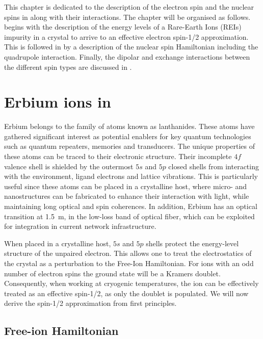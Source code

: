 This chapter is dedicated to the description of the \Er electron spin and the nuclear spins in \Ca along with their interactions. The chapter will be organised as follows.  begins with the description of the energy levels of a Rare-Earth Ions (REIs) impurity in a crystal to arrive to an effective electron spin-1/2 approximation. This is followed in  by a description of the nuclear spin Hamiltonian including the quadrupole interaction. Finally, the dipolar and exchange interactions between the different spin types are discussed in .

\section{Erbium ions in \Ca}

Erbium belongs to the family of atoms known as lanthanides. These atoms have gathered significant interest as potential enablers for key quantum technologies such as quantum repeaters, memories and transducers. The unique properties of these atoms can be traced to their electronic structure. Their incomplete $4f$ valence shell is shielded by the outermost $5s$ and $5p$ closed shells from interacting with the environment, ligand electrons and lattice vibrations. This is particularly useful since these atoms can be placed in a crystalline host, where micro- and nanostructures can be fabricated to enhance their interaction with light, while maintaining long optical and spin coherences. In addition, Erbium has an optical transition at 1.5~\textmu m, in the low-loss band of optical fiber, which can be exploited for integration in current network infrastructure.

When placed in a crystalline host, $5s$ and $5p$ shells protect the energy-level structure of the unpaired electron. This allows one to treat the electrostatics of the crystal as a perturbation to the Free-Ion Hamiltonian. For ions with an odd number of electron spins the ground state will be a Kramers doublet. Consequently, when working at cryogenic temperatures, the ion can be effectively treated as an effective spin-1/2, as only the doublet is populated. We will now derive the spin-1/2 approximation from first principles.

\subsection{Free-ion Hamiltonian}

